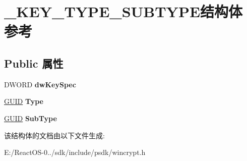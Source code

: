 \hypertarget{struct___k_e_y___t_y_p_e___s_u_b_t_y_p_e}{}\section{\+\_\+\+K\+E\+Y\+\_\+\+T\+Y\+P\+E\+\_\+\+S\+U\+B\+T\+Y\+P\+E结构体 参考}
\label{struct___k_e_y___t_y_p_e___s_u_b_t_y_p_e}
\subsection*{Public 属性}
\begin{DoxyCompactItemize}
\item 
\mbox{\label{struct___k_e_y___t_y_p_e___s_u_b_t_y_p_e_a0ff8fb2a6320a24b34af7876431b7394}} 
D\+W\+O\+RD {\bfseries dw\+Key\+Spec}
\item 
\mbox{\label{struct___k_e_y___t_y_p_e___s_u_b_t_y_p_e_a8fe82c36f95c4c15b390c73ff4bb9ce9}} 
\hyperlink{interface_g_u_i_d}{G\+U\+ID} {\bfseries Type}
\item 
\mbox{\label{struct___k_e_y___t_y_p_e___s_u_b_t_y_p_e_afaa67e9dbbdf56521a1425e703fae63d}} 
\hyperlink{interface_g_u_i_d}{G\+U\+ID} {\bfseries Sub\+Type}
\end{DoxyCompactItemize}


该结构体的文档由以下文件生成\+:\begin{DoxyCompactItemize}
\item 
E\+:/\+React\+O\+S-\/0../sdk/include/psdk/wincrypt.\+h\end{DoxyCompactItemize}
